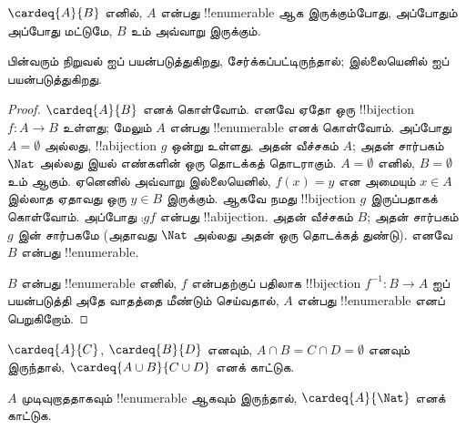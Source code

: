 \documentclass[../../../include/open-logic-section]{subfiles}
\begin{document}
\begin{prop}
$\cardeq{A}{B}$ எனில், $A$ என்பது !!{enumerable} ஆக இருக்கும்போது,
அப்போதும் அப்போது மட்டுமே, $B$ உம் அவ்வாறு இருக்கும்.
\end{prop}

\begin{editorial}
பின்வரும் நிறுவல்  ஐப் பயன்படுத்துகிறது,
 சேர்க்கப்பட்டிருந்தால்;
இல்லையெனில்  ஐப் பயன்படுத்துகிறது.
\end{editorial}

\begin{proof}
$\cardeq{A}{B}$ எனக் கொள்வோம்.
எனவே ஏதோ ஒரு !!{bijection} $f \colon A
\to B$ உள்ளது; மேலும் $A$ என்பது !!{enumerable} எனக் கொள்வோம்.
{
  அப்போது $A = \emptyset$ அல்லது,
  !!a{bijection} $g$ ஒன்று உள்ளது.
  அதன் வீச்சகம் $A$; அதன் சார்பகம் $\Nat$ அல்லது இயல் எண்களின்
  ஒரு தொடக்கத் தொடராகும்.
  $A = \emptyset$ எனில், $B =
  \emptyset$ உம் ஆகும்.
  ஏனெனில் அவ்வாறு இல்லையெனில், $f(x) = y$ என அமையும்
  $x \in A$ இல்லாத ஏதாவது ஒரு $y \in B$ இருக்கும்.
  ஆகவே நமது !!{bijection} $g$ இருப்பதாகக் கொள்வோம்.
  அப்போது $\comp{g}{f}$ என்பது !!a{bijection}.
  அதன் வீச்சகம் $B$; அதன் சார்பகம் $g$ இன் சார்பகமே
  (அதாவது $\Nat$ அல்லது அதன் ஒரு தொடக்கத் துண்டு).
  எனவே $B$ என்பது !!{enumerable}.}

$B$ என்பது !!{enumerable} எனில்,
$f$ என்பதற்குப் பதிலாக !!{bijection}
$f^{-1}\colon B \to A$ ஐப் பயன்படுத்தி அதே வாதத்தை மீண்டும் செய்வதால்,
$A$ என்பது !!{enumerable} எனப் பெறுகிறோம்.
\end{proof}

\begin{prob}
$\cardeq{A}{C}$, $\cardeq{B}{D}$ எனவும்,
$A \cap B =
C \cap D = \emptyset$ எனவும் இருந்தால்,
$\cardeq{A \cup B}{C \cup D}$ எனக் காட்டுக.
\end{prob}

\begin{prob}
$A$ முடிவுறாததாகவும் !!{enumerable} ஆகவும் இருந்தால்,
$\cardeq{A}{\Nat}$ எனக் காட்டுக.
\end{prob}
\end{document}
